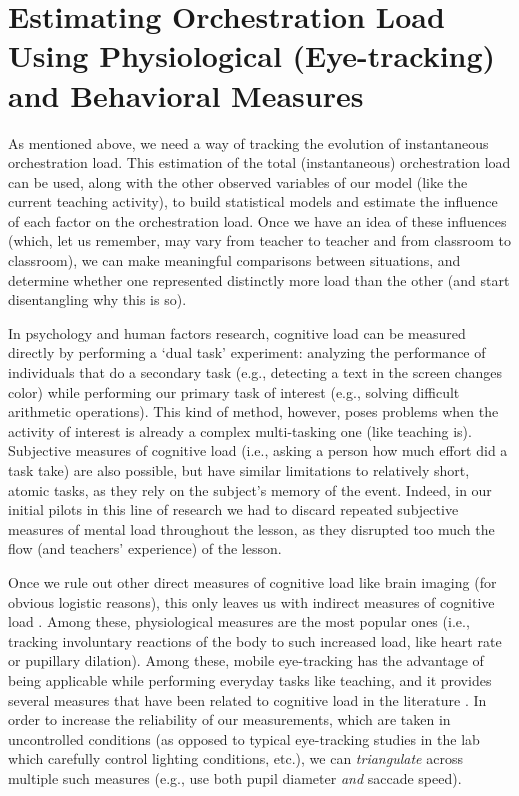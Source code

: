 \documentclass[10pt,journal,compsoc]{IEEEtran}
\begin{document}
\section{Estimating Orchestration Load Using Physiological (Eye-tracking) and Behavioral Measures}
\label{sec:measures}
As mentioned above, we need a way of tracking the evolution of instantaneous orchestration load. This estimation of the total (instantaneous) orchestration load can be used, along with the other observed variables of our model (like the current teaching activity), to build statistical models and estimate the influence of each factor on the orchestration load. Once we have an idea of these influences (which, let us remember, may vary from teacher to teacher and from classroom to classroom), we can make meaningful comparisons between situations, and determine whether one represented distinctly more load than the other (and start disentangling why this is so).

In psychology and human factors research, cognitive load can be measured directly by performing a `dual task' experiment: analyzing the performance of individuals that do a secondary task (e.g., detecting a text in the screen changes color) while performing our primary task of interest (e.g., solving difficult arithmetic operations). This kind of method, however, poses problems when the activity of interest is already a complex multi-tasking one \cite{Paas2003} (like teaching is). Subjective measures of cognitive load (i.e., asking a person how much effort did a task take) are also possible, but have similar limitations to relatively short, atomic tasks, as they rely on the subject's memory of the event. Indeed, in our initial pilots in this line of research we had to discard repeated subjective measures of mental load throughout the lesson, as they disrupted too much the flow (and teachers' experience) of the lesson.

Once we rule out other direct measures of cognitive load like brain imaging (for obvious logistic reasons), this only leaves us with indirect measures of cognitive load \cite{Brunken2003}. Among these, physiological measures are the most popular ones (i.e., tracking involuntary reactions of the body to such increased load, like heart rate or pupillary dilation). Among these, mobile eye-tracking has the advantage of being applicable while performing everyday tasks like teaching, and it provides several measures that have been related to cognitive load in the literature \cite{boucsein2000engineering,Buettner2013}. In order to increase the reliability of our measurements, which are taken in uncontrolled conditions (as opposed to typical eye-tracking studies in the lab which carefully control lighting conditions, etc.), we can \textit{triangulate} across multiple such measures (e.g., use both pupil diameter \textit{and} saccade speed).
\end{document}
